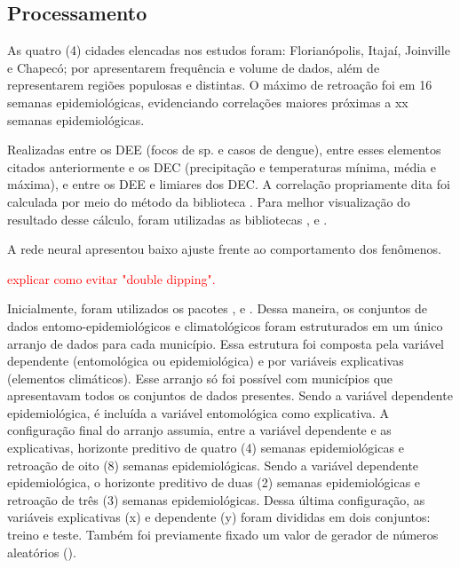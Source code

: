 \documentclass[
	12pt,				%
	openright,			%
	oneside,			%
	a4paper,			%
	english,			%
	french,				%
	spanish,			%
	brazil				%
	dvipsnames, table]{abntex2}
\begin{document}
\subsection{Processamento}

\indent As quatro (4) cidades elencadas nos estudos foram: Florianópolis, Itajaí, Joinville e Chapecó; por apresentarem frequência e volume de dados, além de representarem regiões populosas e distintas. O máximo de retroação foi em 16 semanas epidemiológicas, evidenciando correlações maiores próximas a xx semanas epidemiológicas.

Realizadas entre os \acrshort{DEE} (focos de  sp. e casos de dengue), entre esses elementos citados anteriormente e os \acrshort{DEC} (precipitação e temperaturas mínima, média e máxima), e entre os \acrshort{DEE} e limiares dos \acrshort{DEC}. A correlação propriamente dita foi calculada por meio do método  da biblioteca . Para melhor visualização do resultado desse cálculo, foram utilizadas as bibliotecas ,  e  \cite{seaborn_2021_waskom}.

\indent A rede neural apresentou baixo ajuste frente ao comportamento dos fenômenos.

\indent \textcolor{red}{explicar como evitar "double dipping".}



\indent Inicialmente, foram utilizados os pacotes ,  e  \cite{scikit-learn_2011_pedregosa, sklearn_2013_buitinck}. Dessa maneira, os conjuntos de dados entomo-epidemiológicos e climatológicos foram estruturados em um único arranjo de dados para cada município. Essa estrutura foi composta pela variável dependente (entomológica ou epidemiológica) e por variáveis explicativas (elementos climáticos). Esse arranjo só foi possível com municípios que apresentavam todos os conjuntos de dados presentes. Sendo a variável dependente epidemiológica, é incluída a variável entomológica como explicativa. A configuração final do arranjo assumia, entre a variável dependente e as explicativas, horizonte preditivo de quatro (4) semanas epidemiológicas e retroação de oito (8) semanas epidemiológicas. Sendo a variável dependente epidemiológica, o horizonte preditivo de duas (2) semanas epidemiológicas e retroação de três (3) semanas epidemiológicas. Dessa última configuração, as variáveis explicativas (x) e dependente (y) foram divididas em dois conjuntos: treino e teste. Também foi previamente fixado um valor de gerador de números aleatórios ().
\end{document}
